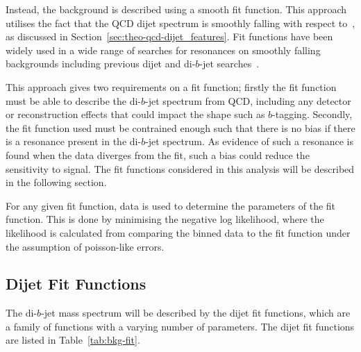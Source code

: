 Instead, the background is described using a smooth fit function.
This approach utilises the fact that the QCD dijet spectrum
is smoothly falling with respect to~\mjj,
as discussed in Section~\ref{sec:theo-qcd-dijet_features}.
Fit functions have been widely used
in a wide range of searches for resonances on smoothly falling backgrounds
including previous dijet and di-$b$-jet searches~\cite{dijet-mori16_paper,dibjet-mori16_paper}.

This approach gives two requirements on a fit function;
firstly the fit function must be able to describe the di-$b$-jet spectrum from QCD,
including any detector or reconstruction effects that could impact the shape such as $b$-tagging.
Secondly,  the fit function used must be contrained enough
such that there is no bias if there is a resonance present in the di-$b$-jet spectrum.
As evidence of such a resonance is found when the data diverges from the fit,
such a bias could reduce the sensitivity to signal.
The fit functions considered in this analysis will be described in the following section.

For any given fit function, 
data is used to determine the parameters of the fit function.
This is done by minimising the negative log likelihood,
where the likelihood is calculated from comparing
the binned data to the fit function
under the assumption of poisson-like errors.

\subsection{Dijet Fit Functions}
\label{sec:bkg-bkg_func}



The di-$b$-jet mass spectrum will be described by the dijet fit functions,
which are a family of functions with a varying number of parameters.
The dijet fit functions are listed in Table~\ref{tab:bkg-fit}.


